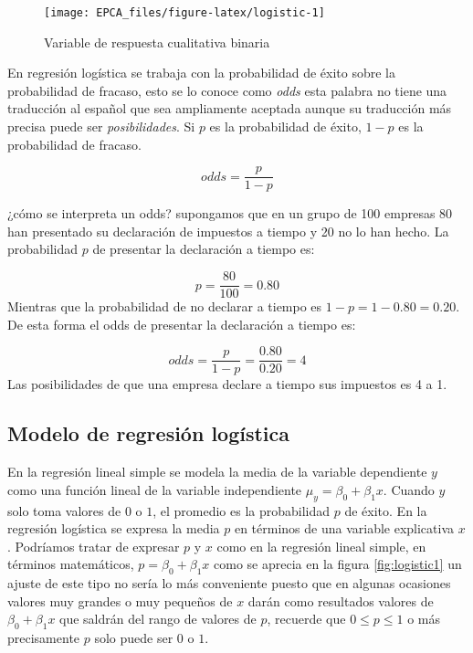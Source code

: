 \documentclass[letterpaper,]{book}
\begin{document}
\begin{figure}[!h]

{\centering \texttt{[image: EPCA\_files/figure-latex/logistic-1]} 

}

\caption{Variable de respuesta cualitativa binaria}\label{fig:logistic}
\end{figure}

En regresión logística se trabaja con la probabilidad de éxito sobre la probabilidad de fracaso, esto se lo conoce como \emph{odds} esta palabra no tiene una traducción al español que sea ampliamente aceptada aunque su traducción más precisa puede ser \emph{posibilidades}. Si \(p\) es la probabilidad de éxito, \(1-p\) es la probabilidad de fracaso.

\begin{equation} 
  odds = \dfrac{p}{1-p}
  \label{eq:odds}
\end{equation}

¿cómo se interpreta un odds? supongamos que en un grupo de 100 empresas 80 han presentado su declaración de impuestos a tiempo y 20 no lo han hecho. La probabilidad \(p\) de presentar la declaración a tiempo es:

\[p=\dfrac{80}{100}=0.80\]
Mientras que la probabilidad de no declarar a tiempo es \(1-p=1-0.80=0.20\). De esta forma el odds de presentar la declaración a tiempo es:

\[ odds = \dfrac{p}{1-p} = \dfrac{0.80}{0.20}=4\]
Las posibilidades de que una empresa declare a tiempo sus impuestos es 4 a 1.

\hypertarget{modelo-de-regresion-logistica}{%
\subsection{Modelo de regresión logística}\label{modelo-de-regresion-logistica}}

En la regresión lineal simple se modela la media de la variable dependiente \(y\) como una función lineal de la variable independiente \(\mu_y=\beta_0+\beta_1x\). Cuando \(y\) solo toma valores de \(0\) o \(1\), el promedio es la probabilidad \(p\) de éxito. En la regresión logística se expresa la media \(p\) en términos de una variable explicativa \(x\). Podríamos tratar de expresar \(p\) y \(x\) como en la regresión lineal simple, en términos matemáticos, \(p=\beta_0+\beta_1x\) como se aprecia en la figura \ref{fig:logistic1} un ajuste de este tipo no sería lo más conveniente puesto que en algunas ocasiones valores muy grandes o muy pequeños de \(x\) darán como resultados valores de \(\beta_0+\beta_1x\) que saldrán del rango de valores de \(p\), recuerde que \(0\leq p \leq 1\) o más precisamente \(p\) solo puede ser \(0\) o \(1\).
\end{document}
